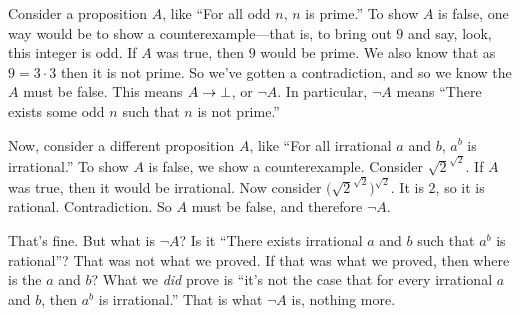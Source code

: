 \documentclass[11pt,paper=letter]{scrartcl}
\renewcommand{\lnot}{\neg}
\begin{document}
Consider a proposition $A$, like ``For all odd $n$, $n$ is prime.'' To show $A$ is false, one way would be to show a counterexample---that is, to bring out $9$ and say, look, this integer is odd. If $A$ was true, then $9$ would be prime. We also know that as $9 = 3 \cdot 3$ then it is not prime. So we've gotten a contradiction, and so we know the $A$ must be false. This means $A \to \bot$, or $\lnot A$. In particular, $\lnot A$ means ``There exists some odd $n$ such that $n$ is not prime.''

Now, consider a different proposition $A$, like ``For all irrational $a$ and $b$, $a^b$ is irrational.'' To show $A$ is false, we show a counterexample. Consider $\sqrt{2}^{\sqrt{2}}$. If $A$ was true, then it would be irrational. Now consider $\Big(\sqrt{2}^{\sqrt{2}}\Big)^{\sqrt{2}}$. It is $2$, so it is rational. Contradiction. So $A$ must be false, and therefore $\lnot A$.

That's fine. But what is $\lnot A$? Is it ``There exists irrational $a$ and $b$ such that $a^b$ is rational''? That was not what we proved. If that was what we proved, then where is the $a$ and $b$? What we \emph{did} prove is ``it's not the case that for every irrational $a$ and $b$, then $a^b$ is irrational.'' That is what $\lnot A$ is, nothing more.


\end{document}
